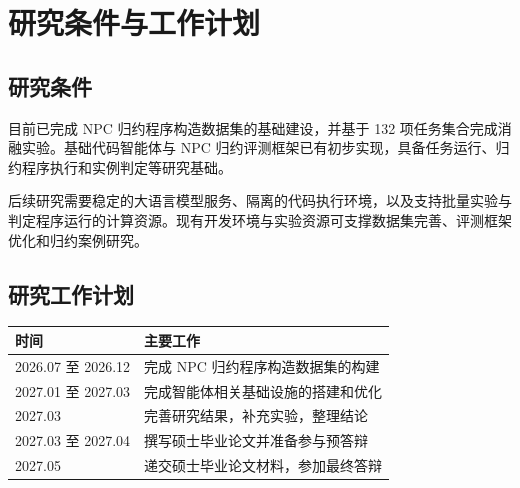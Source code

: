 \chapter{研究条件与工作计划}\label{chap:plan}

\section{研究条件}

目前已完成 NPC 归约程序构造数据集的基础建设，并基于 132 项任务集合完成消融实验。基础代码智能体与 NPC 归约评测框架已有初步实现，具备任务运行、归约程序执行和实例判定等研究基础。

后续研究需要稳定的大语言模型服务、隔离的代码执行环境，以及支持批量实验与判定程序运行的计算资源。现有开发环境与实验资源可支撑数据集完善、评测框架优化和归约案例研究。

\section{研究工作计划}

\begin{table}[!htbp]
    \label{tab:work-plan}
    \centering
    \footnotesize
    \setlength{\tabcolsep}{4pt}
    \renewcommand{\arraystretch}{1.08}
    \begin{tabular}{p{}p{}}
        \hline
        时间 & 主要工作\\
        \hline
        2026.07 至 2026.12 & 完成 NPC 归约程序构造数据集的构建\\
        2027.01 至 2027.03 & 完成智能体相关基础设施的搭建和优化\\
        2027.03 & 完善研究结果，补充实验，整理结论\\
        2027.03 至 2027.04 & 撰写硕士毕业论文并准备参与预答辩\\
        2027.05 & 递交硕士毕业论文材料，参加最终答辩\\
        \hline
    \end{tabular}
\end{table}
\FloatBarrier
